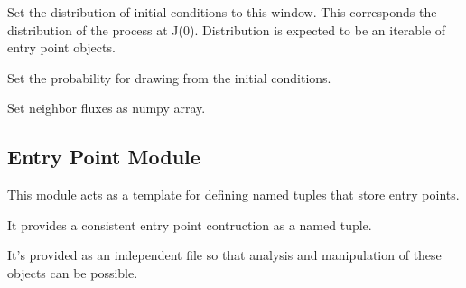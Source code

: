 \documentclass[letterpaper,10pt,english]{sphinxmanual}
\begin{document}
\begin{fulllineitems}
\begin{fulllineitems}
\label{applications/applications.doc:window.window.set_initial_conditions}
Set the distribution of initial conditions to this window. This corresponds the distribution of the process at J(0). Distribution is expected to be an iterable of entry point objects.

\end{fulllineitems}


\begin{fulllineitems}
\label{applications/applications.doc:window.window.set_initial_conditions_probability}
Set the probability for drawing from the initial conditions.

\end{fulllineitems}


\begin{fulllineitems}
\label{applications/applications.doc:window.window.update_fluxes}
Set neighbor fluxes as numpy array.

\end{fulllineitems}


\end{fulllineitems}



\subsection{Entry Point Module}
\label{applications/applications.doc:entry-point-module}\label{applications/applications.doc:module-entryPoints}
This module acts as a template for defining named tuples that store entry points.

It provides a consistent entry point contruction as a named tuple.

It's provided as an independent file so that analysis and manipulation of these objects can be possible.
\end{document}
